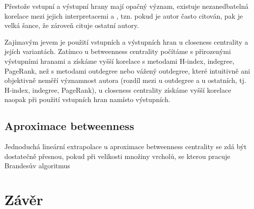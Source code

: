 \documentclass{bakalarka}
\begin{document}
Přestože vstupní a výstupní hrany mají opačný význam, existuje nezanedbatelná
korelace mezi jejich interpretacemi  a , tzn. pokud
je autor často citován, pak je velká šance, že zároveň cituje ostatní autory.

Zajímavým jevem je použití vstupních a výstupních hran u closeness centrality a
jejích variantách. Zatímco u betweenness centrality počítáme s přirozenými
výstupními hranami a získáme vyšší korelace s metodami H-index, indegree,
PageRank, než s metodami outdegree nebo vážený outdegree, které intuitivně ani
objektivně neměří významnost autora (rozdíl mezi  u outdegree a
 u ostatních, tj. H-index, indegree, PageRank), u closeness
centrality získáme vyšší korelace naopak při použití vstupních hran namísto
výstupních.

\section{Aproximace betweenness}
Jednoduchá lineární extrapolace u aproximace betweenness centrality se zdá být dostatečně přesnou, pokud při velikosti množiny vrcholů, se kterou pracuje Brandesův algoritmus

\chapter{Závěr}





\appendix

\newpage
\end{document}
